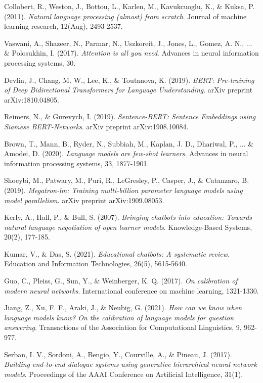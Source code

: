 \documentclass[12pt,a4paper]{article}
\begin{document}
\begin{thebibliography}{99}
Collobert, R., Weston, J., Bottou, L., Karlen, M., Kavukcuoglu, K., \& Kuksa, P. (2011).
\textit{Natural language processing (almost) from scratch}.
Journal of machine learning research, 12(Aug), 2493-2537.

Vaswani, A., Shazeer, N., Parmar, N., Uszkoreit, J., Jones, L., Gomez, A. N., ... \& Polosukhin, I. (2017).
\textit{Attention is all you need}.
Advances in neural information processing systems, 30.

Devlin, J., Chang, M. W., Lee, K., \& Toutanova, K. (2019).
\textit{BERT: Pre-training of Deep Bidirectional Transformers for Language Understanding}.
arXiv preprint arXiv:1810.04805.

Reimers, N., \& Gurevych, I. (2019).
\textit{Sentence-BERT: Sentence Embeddings using Siamese BERT-Networks}.
arXiv preprint arXiv:1908.10084.

Brown, T., Mann, B., Ryder, N., Subbiah, M., Kaplan, J. D., Dhariwal, P., ... \& Amodei, D. (2020).
\textit{Language models are few-shot learners}.
Advances in neural information processing systems, 33, 1877-1901.

Shoeybi, M., Patwary, M., Puri, R., LeGresley, P., Casper, J., \& Catanzaro, B. (2019).
\textit{Megatron-lm: Training multi-billion parameter language models using model parallelism}.
arXiv preprint arXiv:1909.08053.

Kerly, A., Hall, P., \& Bull, S. (2007).
\textit{Bringing chatbots into education: Towards natural language negotiation of open learner models}.
Knowledge-Based Systems, 20(2), 177-185.

Kumar, V., \& Das, S. (2021).
\textit{Educational chatbots: A systematic review}.
Education and Information Technologies, 26(5), 5615-5640.

Guo, C., Pleiss, G., Sun, Y., \& Weinberger, K. Q. (2017).
\textit{On calibration of modern neural networks}.
International conference on machine learning, 1321-1330.

Jiang, Z., Xu, F. F., Araki, J., \& Neubig, G. (2021).
\textit{How can we know when language models know? On the calibration of language models for question answering}.
Transactions of the Association for Computational Linguistics, 9, 962-977.

Serban, I. V., Sordoni, A., Bengio, Y., Courville, A., \& Pineau, J. (2017).
\textit{Building end-to-end dialogue systems using generative hierarchical neural network models}.
Proceedings of the AAAI Conference on Artificial Intelligence, 31(1).


\end{thebibliography}
\end{document}
